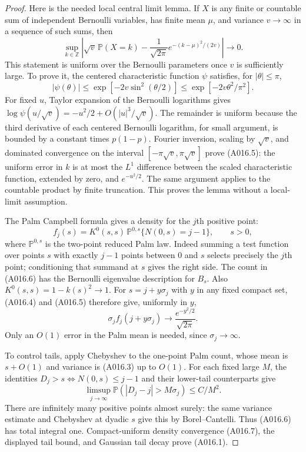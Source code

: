 \begin{proof}
Here is the needed local central limit lemma. If $X$ is any finite
or countable sum of independent Bernoulli variables, has finite
mean $\mu$, and variance $v\to\infty$ in a sequence of such sums,
then
\[
 \sup_{k\in\mathbb Z}\left|
 \sqrt v\,\mathbb P(X=k)
 -\frac1{\sqrt{2\pi}}e^{-(k-\mu)^2/(2v)}
 \right|\longrightarrow0.                            \tag{A016.5}
\]
This statement is uniform over the Bernoulli parameters once $v$
is sufficiently large. To prove it, the centered characteristic
function $\psi$ satisfies, for $|\theta|\le\pi$,
\[
 |\psi(\theta)|\le
 \exp[-2v\sin^2(\theta/2)]
 \le\exp[-2v\theta^2/\pi^2].
\]
For fixed $u$, Taylor expansion of the Bernoulli logarithms gives
$\log\psi(u/\sqrt v)=-u^2/2+O(|u|^3/\sqrt v)$.
The remainder is uniform because the third derivative of each
centered Bernoulli logarithm, for small argument, is bounded by a
constant times $p(1-p)$. Fourier inversion, scaling by $\sqrt v$,
and dominated convergence on the interval
$[-\pi\sqrt v,\pi\sqrt v]$ prove (A016.5): the uniform error
in $k$ is at most the $L^1$ difference between the scaled
characteristic function, extended by zero, and $e^{-u^2/2}$.
The same argument applies to the countable product by finite
truncation. This proves the lemma without a local-limit assumption.

The Palm Campbell formula gives a density for the $j$th positive
point:
\[
 f_j(s)=K^0(s,s)\,
 \mathbb P^{0,s}\{N(0,s)=j-1\},\qquad s>0,            \tag{A016.6}
\]
where $\mathbb P^{0,s}$ is the two-point reduced Palm law.
Indeed summing a test function over points $s$ with exactly $j-1$
points between $0$ and $s$ selects precisely the $j$th point;
conditioning that summand at $s$ gives the right side.
The count in (A016.6) has the Bernoulli eigenvalue description for
$B_s$. Also $K^0(s,s)=1-k(s)^2\to1$.
For $s=j+y\sigma_j$ with $y$ in any fixed compact set, (A016.4)
and (A016.5) therefore give, uniformly in $y$,
\[
 \sigma_j f_j(j+y\sigma_j)
       \longrightarrow\frac{e^{-y^2/2}}{\sqrt{2\pi}}. \tag{A016.7}
\]
Only an $O(1)$ error in the Palm mean is needed, since
$\sigma_j\to\infty$.

To control tails, apply Chebyshev to the one-point Palm count,
whose mean is $s+O(1)$ and variance is (A016.3) up to $O(1)$.
For each fixed large $M$, the identities
$D_j>s\iff N(0,s)\le j-1$ and their lower-tail counterparts give
\[
 \limsup_{j\to\infty}
 \mathbb P(|D_j-j|>M\sigma_j)\le C/M^2.
\]
There are infinitely many positive points almost surely: the same
variance estimate and Chebyshev at dyadic $s$ give this by
Borel--Cantelli. Thus (A016.6) has total integral one.
Compact-uniform density convergence (A016.7), the displayed tail
bound, and Gaussian tail decay prove (A016.1).


\end{proof}
